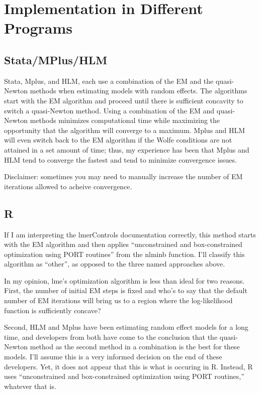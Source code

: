 \documentclass[
  letterpaper,
  DIV=11,
  numbers=noendperiod]{scrreprt}
\begin{document}
\hypertarget{implementation-in-different-programs}{%
\section{Implementation in Different
Programs}\label{implementation-in-different-programs}}

\hypertarget{statamplushlm}{%
\subsection{Stata/MPlus/HLM}\label{statamplushlm}}

Stata, Mplus, and HLM, each use a combination of the EM and the
quasi-Newton methods when estimating models with random effects. The
algorithms start with the EM algorithm and proceed until there is
sufficient concavity to switch a quasi-Newton method. Using a
combination of the EM and quasi-Newton methods minimizes computational
time while maximizing the opportunity that the algorithm will converge
to a maximum. Mplus and HLM will even switch back to the EM algorithm if
the Wolfe conditions are not attained in a set amount of time; thus, my
experience has been that Mplus and HLM tend to converge the fastest and
tend to minimize convergence issues.

Disclaimer: sometimes you may need to manually increase the number of EM
iterations allowed to acheive convergence.

\hypertarget{r}{%
\subsection{R}\label{r}}

If I am interpreting the lmerControls documentation correctly, this
method starts with the EM algorithm and then applies ``unconstrained and
box-constrained optimization using PORT routines'' from the nlminb
function. I'll classify this algorithm as ``other'', as opposed to the
three named approaches above.

In my opinion, lme's optimization algorithm is less than ideal for two
reasons. First, the number of initial EM steps is fixed and who's to say
that the default number of EM iterations will bring us to a region where
the log-likelihood function is sufficiently concave?

Second, HLM and Mplus have been estimating random effect models for a
long time, and developers from both have come to the conclusion that the
quasi-Newton method as the second method in a combination is the best
for these models. I'll assume this is a very informed decision on the
end of these developers. Yet, it does not appear that this is what is
occuring in R. Instead, R uses ``unconstrained and box-constrained
optimization using PORT routines,'' whatever that is.
\end{document}
